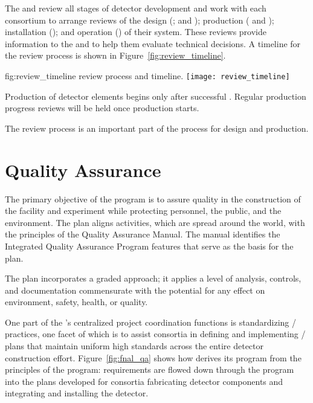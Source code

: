 The  and  review all stages of detector development
and work with each consortium to arrange reviews of the design
(;  and ); production (
and ); installation (); and operation
() of their system.  These reviews provide information to
the  and  to help them evaluate technical
decisions. A timeline for the review process is shown in
Figure~\ref{fig:review_timeline}.
\begin{dunefigure}{fig:review_timeline}
  { review process and timeline.}
  \texttt{[image: review\_timeline]}
\end{dunefigure}

Production of detector elements begins only after successful
. Regular production progress reviews will be held once
production starts. 

The review process is an important part of the  
process for design and production.

\section{Quality Assurance}
\label{sec:es-tc-qa}

The primary objective of the   program is
to assure quality in the construction of the  facility and
 experiment while protecting
 personnel, the public, and the environment. The
 plan aligns   activities, which
are spread around the world, with the principles of the \fnal Quality
Assurance Manual. The manual identifies the \fnal Integrated Quality
Assurance Program features that serve as the basis for the
  plan.

The   plan incorporates 
a graded approach; it applies a level of analysis,
controls, and documentation commensurate with the potential for any effect on
environment, safety, health, or quality.

One part of the 's centralized project
coordination functions is
standardizing / practices, one facet
of which is to assist consortia in defining and implementing
/ plans that maintain uniform high
standards across the entire detector construction
effort. Figure~\ref{fig:fnal_qa} shows how  
derives its  program from the principles of the \fnal {} program:
requirements are flowed down through the 
 program into the  plans developed for consortia fabricating detector components and integrating and installing the detector.

